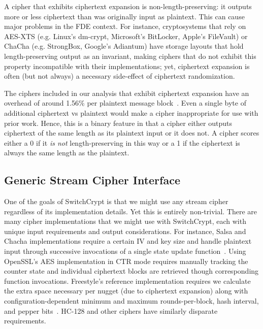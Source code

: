 A cipher that exhibits ciphertext expansion is non-length-preserving: it outputs
more or less ciphertext than was originally input as plaintext. This can cause
major problems in the FDE context. For instance, cryptosystems that rely on
AES-XTS (e.g. Linux's dm-crypt, Microsoft's BitLocker, Apple's FileVault) or
ChaCha (e.g. StrongBox, Google's Adiantum) have storage layouts that hold
length-preserving output as an invariant, making ciphers that do not exhibit
this property incompatible with their implementations; yet, ciphertext expansion
is often (but not always) a necessary side-effect of ciphertext randomization.

The ciphers included in our analysis that exhibit ciphertext expansion have an
overhead of around 1.56\% per plaintext message block~\cite{Freestyle}. Even a
single byte of additional ciphertext vs plaintext would make a cipher
inappropriate for use with prior work. Hence, this is a binary feature in that a
cipher either outputs ciphertext of the same length as its plaintext input or it
does not. A cipher scores either a 0 if it \emph{is not} length-preserving in
this way or a 1 if the ciphertext is always the same length as the plaintext.

\subsection{Generic Stream Cipher Interface} \label{subsec:interface}

One of the goals of SwitchCrypt is that we might use any stream cipher
regardless of its implementation details. Yet this is entirely non-trivial.
There are many cipher implementations that we might use with SwitchCrypt, each
with unique input requirements and output considerations. For instance, Salsa
and Chacha implementations require a certain IV and key size and handle
plaintext input through successive invocations of a single state update
function~\cite{Floodyberry}. Using OpenSSL's AES implementation in CTR mode
requires manually tracking the counter state and individual ciphertext blocks
are retrieved though corresponding function invocations. Freestyle's reference
implementation requires we calculate the extra space necessary per nugget (due
to ciphertext expansion) along with configuration-dependent minimum and maximum
rounds-per-block, hash interval, and pepper bits~\cite{Freestyle}. HC-128 and
other ciphers have similarly disparate requirements.

